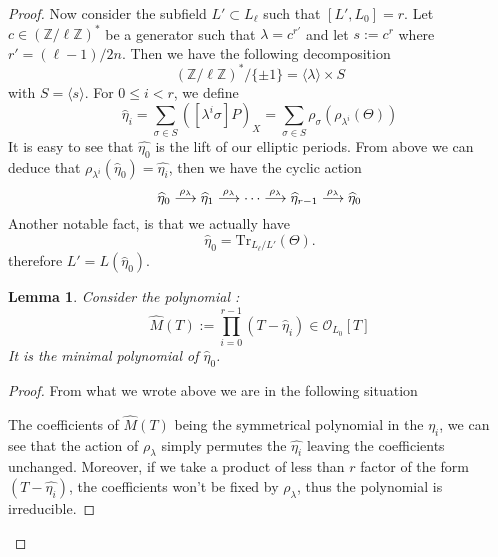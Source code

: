 \documentclass[12pt]{article}
\theoremstyle{plain}
\newtheorem{lemma}[theorem]{Lemma}
\theoremstyle{definition}
\def\Z{\ensuremath{\mathbb{Z}}}
\begin{document}
\begin{proof}
Now consider the subfield $L'\subset L_\ell$ such that $[L', L_0] = r$. Let 
$c\in(\Z/\ell\Z)^{\ast}$ be a generator such that $\lambda=c^{r'}$ and let $s:=c^r$ 
where $r' = (\ell-1)/2n$. Then we have the following decomposition
\[
(\Z/\ell\Z)^{\ast}/\lbrace{\pm1}\rbrace = \langle{\lambda}\rangle \times S
\]
with $S = \langle{s}\rangle$. For $0 \leq i < r$, we define 
\begin{equation}
\widehat{\eta}_i = \sum_{\sigma\in S}{\left([\lambda^i\sigma]P\right)_X} =
\sum_{\sigma\in S}{\rho_{\sigma}(\rho_{\lambda^i}(\Theta))}
\end{equation}
It is easy to see that $\widehat{\eta_0}$ is the lift of our elliptic periods.
From above we can deduce that $\rho_{\lambda^i}(\widehat{\eta}_0) = 
\widehat{\eta_i}$, then we have the cyclic action
\begin{equation}
\widehat{\eta}_0 \buildrel\rho_\lambda\over\longrightarrow
\widehat{\eta}_1 \buildrel\rho_\lambda\over\longrightarrow \dots 
\buildrel\rho_\lambda\over\longrightarrow \widehat{\eta}_{r-1}
\buildrel\rho_\lambda\over\longrightarrow \widehat{\eta}_0
\end{equation}
Another notable fact, is that we actually have
\begin{equation}
\widehat{\eta}_0=\text{Tr}_{L_\ell/L'}(\Theta).
\end{equation}
therefore $L' = L(\widehat{\eta}_0)$.

\begin{lemma}
Consider the polynomial :
\begin{equation}
\widehat{M}(T):=\prod_{i=0}^{r-1}{(T-\widehat{\eta}_i)}\in\mathcal{O}_{L_0}[T]
\end{equation}
It is the minimal polynomial of $\widehat{\eta}_0$.
\end{lemma}

\begin{proof}
From what we wrote above we are in the following situation
\begin{center}
\end{center}
The coefficients of $\widehat{M}(T)$ being the symmetrical polynomial in the $\eta_i$, we
can see that the action of $\rho_\lambda$ simply permutes the $\widehat{\eta_i}$
leaving the coefficients unchanged. Moreover, if we take a product of less than
$r$ factor of the form $(T - \widehat{\eta_i})$, the coefficients won't be fixed
by $\rho_\lambda$, thus the polynomial is irreducible.


\end{proof}
\end{proof}
\end{document}
